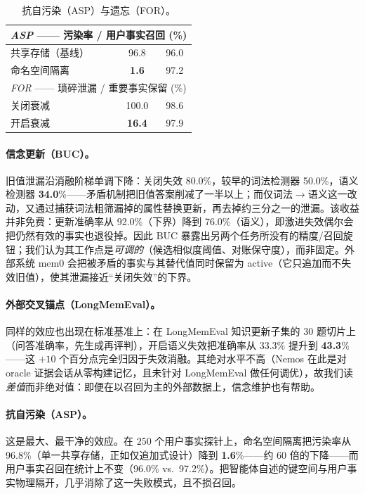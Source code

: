 \documentclass[11pt,fontset=fandol]{ctexart}
\newcommand{\bucSLRfull}{\textbf{34.0}}   %
\newcommand{\bucSLRvone}{50.0}            %
\newcommand{\bucSLRnone}{80.0}            %
\newcommand{\bucUAfull}{76.0}
\newcommand{\bucUAnone}{92.0}
\newcommand{\aspPRiso}{\textbf{1.6}}
\newcommand{\aspPRshared}{96.8}
\newcommand{\aspUFRiso}{97.2}
\newcommand{\aspUFRshared}{96.0}
\newcommand{\forTLdecay}{\textbf{16.4}}
\newcommand{\forTLnone}{100.0}
\newcommand{\forIFRdecay}{97.9}
\newcommand{\forIFRnone}{98.6}
\newcommand{\lmeAccFull}{\textbf{43.3}}
\newcommand{\lmeAccNone}{33.3}
\newcommand{\lmeN}{30}
\begin{document}
\begin{table}[t]\centering
\caption{抗自污染（ASP）与遗忘（FOR）。}
\begin{tabular}{lcc}
\toprule
\multicolumn{3}{l}{\emph{ASP} —— 污染率 / 用户事实召回 (\%)}\\
\midrule
共享存储（基线）  & \aspPRshared{} & \aspUFRshared{} \\
命名空间隔离      & \aspPRiso{}    & \aspUFRiso{} \\
\midrule
\multicolumn{3}{l}{\emph{FOR} —— 琐碎泄漏 / 重要事实保留 (\%)}\\
\midrule
关闭衰减          & \forTLnone{}   & \forIFRnone{} \\
开启衰减          & \forTLdecay{}  & \forIFRdecay{} \\
\bottomrule
\end{tabular}
\end{table}

\paragraph{信念更新（BUC）。}旧值泄漏沿消融阶梯单调下降：关闭失效 \bucSLRnone{}\%，较早的词法检测器 \bucSLRvone{}\%，语义检测器 \bucSLRfull{}\%——矛盾机制把旧值答案削减了一半以上；而仅词法$\rightarrow$语义这一改动，又通过捕获词法粗筛漏掉的属性替换更新，再去掉约三分之一的泄漏。该收益并非免费：更新准确率从 \bucUAnone{}\%（下界）降到 \bucUAfull{}\%（语义），即激进失效偶尔会把仍然有效的事实也退役掉。因此 BUC 暴露出另两个任务所没有的精度/召回旋钮；我们认为其工作点是\emph{可调的}（候选相似度阈值、对账保守度），而非固定。外部系统 mem0 会把被矛盾的事实与其替代值同时保留为 active（它只追加而不失效旧值），使其泄漏接近“关闭失效”的下界。

\paragraph{外部交叉锚点（LongMemEval）。}同样的效应也出现在标准基准上：在 LongMemEval 知识更新子集的 \lmeN{} 题切片上（问答准确率，先生成再评判），开启语义失效把准确率从 \lmeAccNone{}\% 提升到 \lmeAccFull{}\%——这 $+10$ 个百分点完全归因于失效消融。其绝对水平不高（Nemos 在此是对 oracle 证据会话从零构建记忆，且未针对 LongMemEval 做任何调优），故我们读\emph{差值}而非绝对值：即便在以召回为主的外部数据上，信念维护也有帮助。

\paragraph{抗自污染（ASP）。}这是最大、最干净的效应。在 $250$ 个用户事实探针上，命名空间隔离把污染率从 \aspPRshared{}\%（单一共享存储，正如仅追加式设计）降到 \aspPRiso{}\%——约 60 倍的下降——而用户事实召回在统计上不变（\aspUFRshared{}\% vs.\ \aspUFRiso{}\%）。把智能体自述的键空间与用户事实物理隔开，几乎消除了这一失败模式，且不损召回。
\end{document}
